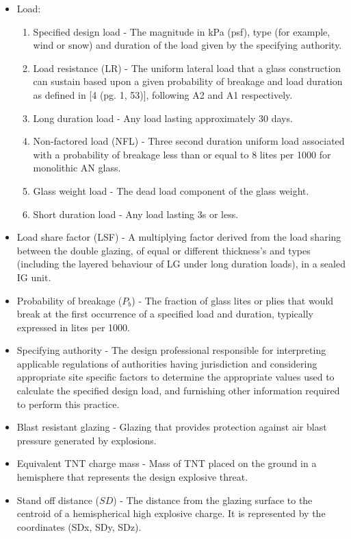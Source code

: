 \documentclass[12pt]{article}
\begin{document}
\begin{itemize}
\item{Load:}
\begin{enumerate}
\item{Specified design load - The magnitude in kPa (psf), type (for example, wind or snow) and duration of the load given by the specifying authority.}
\item{Load resistance (LR) - The uniform lateral load that a glass construction can sustain based upon a given probability of breakage and load duration as defined in [4 (pg. 1, 53)], following A2 and A1 respectively.}
\item{Long duration load - Any load lasting approximately 30 days.}
\item{Non-factored load (NFL) - Three second duration uniform load associated with a probability of breakage less than or equal to 8 lites per 1000 for monolithic AN glass.}
\item{Glass weight load - The dead load component of the glass weight.}
\item{Short duration load - Any load lasting 3s or less.}
\end{enumerate}
\item{Load share factor (LSF) - A multiplying factor derived from the load sharing between the double glazing, of equal or different thickness's and types (including the layered behaviour of LG under long duration loads), in a sealed IG unit.}
\item{Probability of breakage ($P_{b}$) - The fraction of glass lites or plies that would break at the first occurrence of a specified load and duration, typically expressed in lites per 1000.}
\item{Specifying authority - The design professional responsible for interpreting applicable regulations of authorities having jurisdiction and considering appropriate site specific factors to determine the appropriate values used to calculate the specified design load, and furnishing other information required to perform this practice.}
\item{Blast resistant glazing - Glazing that provides protection against air blast pressure generated by explosions.}
\item{Equivalent TNT charge mass - Mass of TNT placed on the ground in a hemisphere that represents the design explosive threat.}
\item{Stand off distance ($SD$) - The distance from the glazing surface to the centroid of a hemispherical high explosive charge. It is represented by the coordinates (SDx, SDy, SDz).}
\end{itemize}
\end{document}
